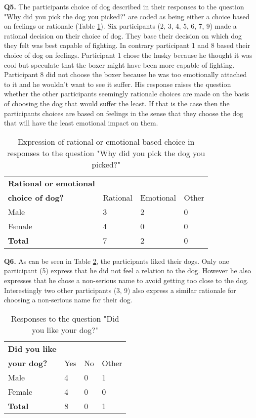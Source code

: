 \textbf{Q5.} The participants choice of dog described in their responses to the question "Why did you pick the dog you picked?" are coded as being either a choice based on feelings or rationale (Table \ref{tab:rati}). Six participants (2, 3, 4, 5, 6, 7, 9) made a rational decision on their choice of dog. They base their decision on which dog they felt was best capable of fighting. In contrary participant 1 and 8 based their choice of dog on feelings. Participant 1 chose the husky because he thought it was cool but speculate that the boxer might have been more capable of fighting. Participant 8 did not choose the boxer because he was too emotionally attached to it and he wouldn't want to see it suffer. His response raises the question whether the other participants seemingly rationale choices are made on the basis of choosing the dog that would suffer the least. If that is the case then the participants choices are based on feelings in the sense that they choose the dog that will have the least emotional impact on them.

\begin{table}[h]
\centering
\begin{tabular}{l l l l}
\hline
\textbf{Rational or emotional}\\
\textbf{choice of dog?} & Rational & Emotional & Other \\
\hline
Male & 3 & 2 & 0 \\
Female & 4 & 0 & 0 \\
\textbf{Total} & 7 & 2 & 0 \\
\hline
\end{tabular}
\caption{\label{tab:rati}Expression of rational or emotional based choice in responses to the question "Why did you pick the dog you picked?"}
\end{table}


\textbf{Q6.} As can be seen in Table \ref{tab:like}, the participants liked their dogs. Only one participant (5) express that he did not feel a relation to the dog. However he also expresses that he chose a non-serious name to avoid getting too close to the dog. Interestingly two other participants (3, 9) also express a similar rationale for choosing a non-serious name for their dog. 

\begin{table}[h]
\centering
\begin{tabular}{l l l l}
\hline
\textbf{Did you like}\\
\textbf{your dog?} & Yes & No & Other \\
\hline
Male & 4 & 0 & 1 \\
Female & 4 & 0 & 0 \\
\textbf{Total} & 8 & 0 & 1 \\
\hline
\end{tabular}
\caption{\label{tab:like}Responses to the question "Did you like your dog?"}
\end{table}


